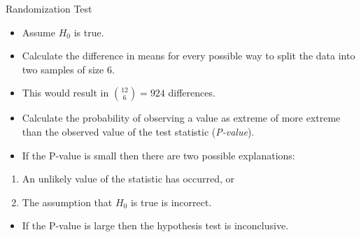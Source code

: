 \documentclass[9pt,ignorenonframetext,]{beamer}
\providecommand{\tightlist}{%
\setlength{\itemsep}{0pt}\setlength{\parskip}{0pt}}
\begin{document}
\begin{frame}{Randomization Test}

\begin{itemize}
\item
  Assume \(H_0\) is true.
\item
  Calculate the difference in means for every possible way to split the
  data into two samples of size 6.
\item
  This would result in \({{12}\choose{6}}=924\) differences.
\item
  Calculate the probability of observing a value as extreme of more
  extreme than the observed value of the test statistic
  (\emph{P-value}).
\item
  If the P-value is small then there are two possible explanations:
\end{itemize}

\begin{enumerate}
\def\labelenumi{\arabic{enumi}.}
\item
  An unlikely value of the statistic has occurred, or
\item
  The assumption that \(H_0\) is true is incorrect.
\end{enumerate}

\begin{itemize}
\tightlist
\item
  If the P-value is large then the hypothesis test is inconclusive.
\end{itemize}

\end{frame}
\end{document}
